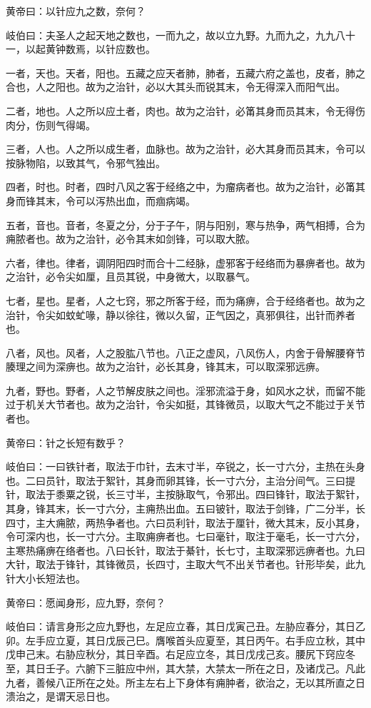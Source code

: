 \documentclass[a4paper,12pt,UTF8,twoside]{ctexbook}
\begin{document}
	黄帝曰：以针应九之数，奈何？
	
	岐伯曰：夫圣人之起天地之数也，一而九之，故以立九野。九而九之，九九八十一，以起黄钟数焉，以针应数也。
	
	一者，天也。天者，阳也。五藏之应天者肺，肺者，五藏六府之盖也，皮者，肺之合也，人之阳也。故为之治针，必以大其头而锐其末，令无得深入而阳气出。
	
	二者，地也。人之所以应土者，肉也。故为之治针，必筩其身而员其末，令无得伤肉分，伤则气得竭。
	
	三者，人也。人之所以成生者，血脉也。故为之治针，必大其身而员其末，令可以按脉物陷，以致其气，令邪气独出。
	
	四者，时也。时者，四时八风之客于经络之中，为瘤病者也。故为之治针，必筩其身而锋其末，令可以泻热出血，而痼病竭。
	
	五者，音也。音者，冬夏之分，分于子午，阴与阳别，寒与热争，两气相搏，合为痈脓者也。故为之治针，必令其末如剑锋，可以取大脓。
	
	六者，律也。律者，调阴阳四时而合十二经脉，虚邪客于经络而为暴痹者也。故为之治针，必令尖如厘，且员其锐，中身微大，以取暴气。
	
	七者，星也。星者，人之七窍，邪之所客于经，而为痛痹，合于经络者也。故为之治针，令尖如蚊虻喙，静以徐往，微以久留，正气因之，真邪俱往，出针而养者也。
	
	八者，风也。风者，人之股肱八节也。八正之虚风，八风伤人，内舍于骨解腰脊节腠理之间为深痹也。故为之治针，必长其身，锋其末，可以取深邪远痹。
	
	九者，野也。野者，人之节解皮肤之间也。淫邪流溢于身，如风水之状，而留不能过于机关大节者也。故为之治针，令尖如挺，其锋微员，以取大气之不能过于关节者也。
	
	黄帝曰：针之长短有数乎？
	
	岐伯曰：一曰铁针者，取法于巾针，去末寸半，卒锐之，长一寸六分，主热在头身也。二曰员针，取法于絮针，其身而卵其锋，长一寸六分，主治分间气。三曰提针，取法于黍粟之锐，长三寸半，主按脉取气，令邪出。四曰锋针，取法于絮针，其身，锋其末，长一寸六分，主痈热出血。五曰铍针，取法于剑锋，广二分半，长四寸，主大痈脓，两热争者也。六曰员利针，取法于厘针，微大其末，反小其身，令可深内也，长一寸六分。主取痈痹者也。七曰毫针，取注于毫毛，长一寸六分，主寒热痛痹在络者也。八曰长针，取法于綦针，长七寸，主取深邪远痹者也。九曰大针，取法于锋针，其锋微员，长四寸，主取大气不出关节者也。针形毕矣，此九针大小长短法也。
	
	黄帝曰：愿闻身形，应九野，奈何？
	
	岐伯曰：请言身形之应九野也，左足应立春，其日戊寅己丑。左胁应春分，其日乙卯。左手应立夏，其日戊辰己巳。膺喉首头应夏至，其日丙午。右手应立秋，其中戊申己末。右胁应秋分，其日辛酉。右足应立冬，其日戊戌己亥。腰尻下窍应冬至，其日壬子。六腑下三脏应中州，其大禁，大禁太一所在之日，及诸戊己。凡此九者，善候八正所在之处。所主左右上下身体有痈肿者，欲治之，无以其所直之日溃治之，是谓天忌日也。
	
\end{document}
